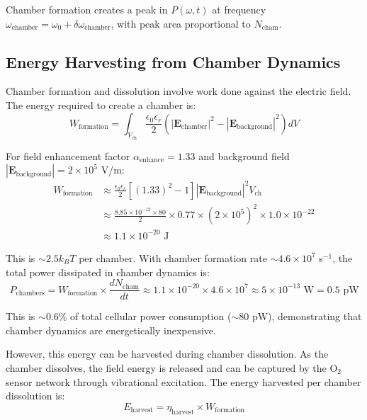 \documentclass[twocolumn,10pt,aps,prd,superscriptaddress,floatfix,nofootinbib]{revtex4-2}
\theoremstyle{remark}
\begin{document}
Chamber formation creates a peak in $P(\omega, t)$ at frequency $\omega_{\mathrm{chamber}} = \omega_0 + \delta\omega_{\mathrm{chamber}}$, with peak area proportional to $N_{\mathrm{cham}}$.

\subsection{Energy Harvesting from Chamber Dynamics}

Chamber formation and dissolution involve work done against the electric field. The energy required to create a chamber is:
\begin{equation}
W_{\mathrm{formation}} = \int_{V_{\mathrm{ch}}} \frac{\epsilon_0\epsilon_r}{2} \left(|\mathbf{E}_{\mathrm{chamber}}|^2 - |\mathbf{E}_{\mathrm{background}}|^2\right) dV
\end{equation}

For field enhancement factor $\alpha_{\mathrm{enhance}} = 1.33$ and background field $|\mathbf{E}_{\mathrm{background}}| = 2 \times 10^{5}$ V/m:
\begin{align}
W_{\mathrm{formation}} &\approx \frac{\epsilon_0\epsilon_r}{2} \left[(1.33)^2 - 1\right] |\mathbf{E}_{\mathrm{background}}|^2 V_{\mathrm{ch}} \nonumber \\
&\approx \frac{8.85 \times 10^{-12} \times 80}{2} \times 0.77 \times (2 \times 10^{5})^2 \times 1.0 \times 10^{-22} \nonumber \\
&\approx 1.1 \times 10^{-20} \text{ J}
\end{align}

This is $\sim 2.5 k_B T$ per chamber. With chamber formation rate $\sim 4.6 \times 10^{7}$ s$^{-1}$, the total power dissipated in chamber dynamics is:
\begin{equation}
P_{\mathrm{chambers}} = W_{\mathrm{formation}} \times \frac{dN_{\mathrm{cham}}}{dt} \approx 1.1 \times 10^{-20} \times 4.6 \times 10^{7} \approx 5 \times 10^{-13} \text{ W} = 0.5 \text{ pW}
\end{equation}

This is $\sim 0.6\%$ of total cellular power consumption ($\sim 80$ pW), demonstrating that chamber dynamics are energetically inexpensive.

However, this energy can be harvested during chamber dissolution. As the chamber dissolves, the field energy is released and can be captured by the O$_2$ sensor network through vibrational excitation. The energy harvested per chamber dissolution is:
\begin{equation}
E_{\mathrm{harvest}} = \eta_{\mathrm{harvest}} \times W_{\mathrm{formation}}
\end{equation}
\end{document}
